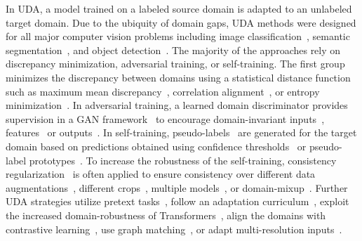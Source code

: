 \documentclass[10pt,twocolumn,letterpaper]{article}
\begin{document}
In UDA, a model trained on a labeled source domain is adapted to an unlabeled target domain. Due to the ubiquity of domain gaps, UDA methods were designed for all major computer vision problems including
image classification~\cite{long2015learning,ganin2016domain,long2018conditional,pan2019transferrable}, semantic segmentation~\cite{hoffman2016fcns,tsai2018learning,zhang2021prototypical,hoyer2021daformer}, and object detection~\cite{chen2018domain, chen2021scale, li2022cross, li2022sigma}.
The majority of the approaches rely on discrepancy minimization, adversarial training, or self-training. 
The first group minimizes the discrepancy between domains using a statistical distance function such as maximum mean discrepancy~\cite{gretton2006kernel,long2015learning,long2017deep}, correlation alignment~\cite{sun2016return,sun2016deep}, or entropy minimization~\cite{grandvalet2004semi,long2016unsupervised,vu2019advent}.
In adversarial training, a learned domain discriminator provides supervision in a GAN framework~\cite{goodfellow2014generative} to encourage domain-invariant inputs~\cite{hoffman2018cycada,gong2019dlow}, features~\cite{ganin2016domain,hoffman2016fcns,long2018conditional,tsai2018learning} or outputs~\cite{saito2018maximum,tsai2018learning,vu2019advent,luo2021category}.
In self-training, pseudo-labels~\cite{lee2013pseudo} are generated for the target domain based on predictions obtained using confidence thresholds~\cite{zhang2018collaborative,zou2018unsupervised,mei2020instance} or pseudo-label prototypes~\cite{pan2019transferrable,zhang2019category,zhang2021prototypical}. To increase the robustness of the self-training, consistency regularization~\cite{sajjadi2016regularization, tarvainen2017mean, sohn2020fixmatch} is often applied to ensure consistency over different data augmentations~\cite{french2017self,choi2019self, melaskyriazi2021pixmatch, araslanov2021self}, different crops~\cite{lai2021semi,hoyer2022hrda}, multiple models~\cite{zhou2020uncertainty,zheng2021rectifying,zhang2021multiple}, or domain-mixup~\cite{tranheden2021dacs, zhou2021context,hoyer2021improving,hoyer2021daformer,hoyer2022hrda}. 
Further UDA strategies utilize pretext tasks~\cite{vu2019dada,chen2019learning,wang2021domain,hoyer2021improving}, follow an adaptation curriculum~\cite{dai2018dark,zhang2019curriculum,dai2020curriculum}, exploit the increased domain-robustness of Transformers~\cite{hoyer2021daformer,xu2021cdtrans,sun2022safe,hoyer2022hrda}, align the domains with contrastive learning~\cite{xie2022sepico,huang2022category}, use graph matching~\cite{cai2019exploring, li2022scan,li2022sigma}, or adapt multi-resolution inputs~\cite{hoyer2022hrda}.
\end{document}
